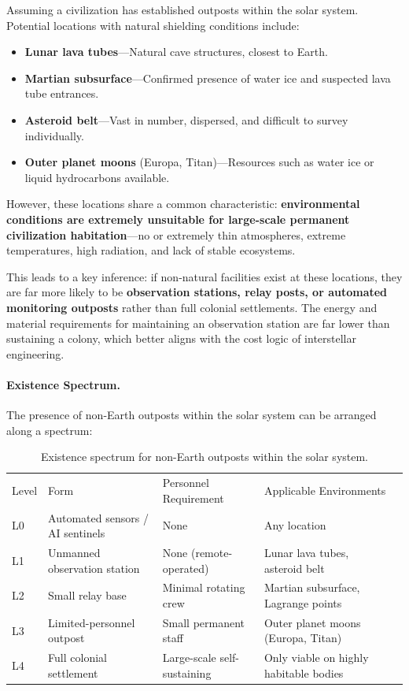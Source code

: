 \documentclass[aps,prd,twocolumn,superscriptaddress,nofootinbib]{revtex4-2}
\begin{document}
Assuming a civilization has established outposts within the solar system. Potential locations with natural shielding conditions include:

\begin{itemize}
  \item \textbf{Lunar lava tubes}---Natural cave structures, closest to Earth.
  \item \textbf{Martian subsurface}---Confirmed presence of water ice and suspected lava tube entrances.
  \item \textbf{Asteroid belt}---Vast in number, dispersed, and difficult to survey individually.
  \item \textbf{Outer planet moons} (Europa, Titan)---Resources such as water ice or liquid hydrocarbons available.
\end{itemize}

However, these locations share a common characteristic: \textbf{environmental conditions are extremely unsuitable for large-scale permanent civilization habitation}---no or extremely thin atmospheres, extreme temperatures, high radiation, and lack of stable ecosystems.

This leads to a key inference: if non-natural facilities exist at these locations, they are far more likely to be \textbf{observation stations, relay posts, or automated monitoring outposts} rather than full colonial settlements. The energy and material requirements for maintaining an observation station are far lower than sustaining a colony, which better aligns with the cost logic of interstellar engineering.

\paragraph{Existence Spectrum.}

The presence of non-Earth outposts within the solar system can be arranged along a spectrum:

\begin{table}[htbp]
\caption{Existence spectrum for non-Earth outposts within the solar system.}
\label{tab:existence-spectrum}
\begin{ruledtabular}
\begin{tabular}{lllll}
Level & Form & Personnel Requirement & Applicable Environments \\
\colrule
L0 & Automated sensors / AI sentinels & None & Any location \\
L1 & Unmanned observation station & None (remote-operated) & Lunar lava tubes, asteroid belt \\
L2 & Small relay base & Minimal rotating crew & Martian subsurface, Lagrange points \\
L3 & Limited-personnel outpost & Small permanent staff & Outer planet moons (Europa, Titan) \\
L4 & Full colonial settlement & Large-scale self-sustaining & Only viable on highly habitable bodies \\
\end{tabular}
\end{ruledtabular}
\end{table}
\end{document}
